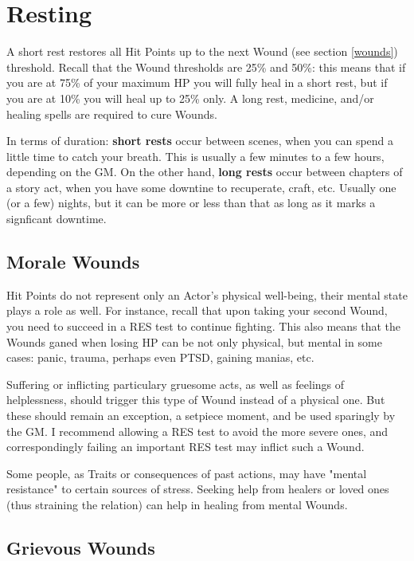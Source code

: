 \section{Resting} 

A short rest restores all Hit Points up to the next Wound (see section \ref{wounds}) threshold. Recall that the Wound thresholds are 25\% and 50\%: this means that if you are at 75\% of your maximum HP you will fully heal in a short rest, but if you are at 10\% you will heal up to 25\% only. A long rest, medicine, and/or healing spells are required to cure Wounds. 

In terms of duration: \textbf{short rests} occur between scenes, when you can spend a little time to catch your breath. This is usually a few minutes to a few hours, depending on the GM. On the other hand, \textbf{long rests} occur between chapters of a story act, when you have some downtine to recuperate, craft, etc. Usually one (or a few) nights, but it can be more or less than that as long as it marks a signficant downtime.


\subsection{Morale Wounds}

Hit Points do not represent only an Actor's physical well-being, their mental state plays a role as well. For instance, recall that upon taking your second Wound, you need to succeed in a RES test to continue fighting. This also means that the Wounds ganed when losing HP can be not only physical, but mental in some cases: panic, trauma, perhaps even PTSD, gaining manias, etc. 

Suffering or inflicting particulary gruesome acts, as well as feelings of helplessness, should trigger this type of Wound instead of a physical one. But these should remain an exception, a setpiece moment, and be used sparingly by the GM. I recommend allowing a RES test to avoid the more severe ones, and correspondingly failing an important RES test may inflict such a Wound.

Some people, as Traits or consequences of past actions, may have "mental resistance" to certain sources of stress. Seeking help from healers or loved ones (thus straining the relation) can help in healing from mental Wounds.


\subsection{Grievous Wounds}

